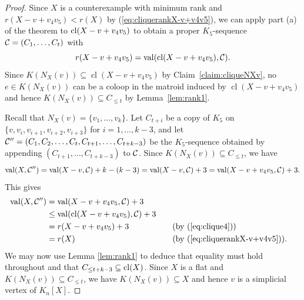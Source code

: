 \documentclass{daj}
\DeclareMathOperator{\cl}{cl}
\begin{document}
\begin{proof}

Since $X$ is a counterexample with minimum rank and $r(X-v+v_4v_5)<r(X)$ by (\ref{eq:cliquerankX-v+v4v5}), we can apply  part (a) of the theorem  
to ${\rm cl}(X-v+v_4v_5)$
to obtain a proper $K_5$-sequence ${\cal C}=(C_1,\dots, C_t)$ with 
\begin{equation}
\label{eq:clique4}
r(X-v+v_4v_5)={\rm val}(\cl(X-v+v_4v_5), {\cal C}).
\end{equation}
Since $K(N_X(v))\subseteq \cl(X-v+v_4v_5)$ by Claim~\ref{claim:cliqueNXv}, no $e\in K(N_X(v))$ can be a coloop in the matroid induced by  $\cl(X-v+v_4v_5)$ and hence 
%
$K(N_X(v))\subseteq  C_{\leq t}$ by Lemma~\ref{lem:rank1}.

Recall that $N_X(v)=\{v_1,\dots, v_k\}$.  Let $C_{t+i}$ be a copy  of $K_5$ on $\{v, v_i, v_{i+1}, v_{i+2}, v_{i+3}\}$ for $i=1, \dots, k-3$, and let ${\cal C}''=(C_1,C_2,\ldots,C_t,C_{t+1},\ldots, C_{t+k-3})$ be the  $K_5$-sequence obtained by
appending $(C_{t+1},\ldots,C_{t+k-3})$ to $\cal C$.
Since $K(N_X(v))\subseteq  C_{\leq t}$, we have $${\rm val}(X,{\cal C}'')={\rm val}(X-v,{\cal C})+k-(k-3)={\rm val}(X-v,{\cal C})+3={\rm val}(X-v+v_4v_5,{\cal C})+3.$$ This gives
\begin{alignat*}{2}
{\rm val}(X,{\cal C}'')&={\rm val}(X-v+v_4v_5,{\cal C})+3  \\
&\leq {\rm val}(\cl(X-v+v_4v_5),{\cal C})+3  \\
&=r(X-v+v_4v_5)+3 & \quad & (\text{by (\ref{eq:clique4})}) \\ 
&=r(X) & & (\text{by (\ref{eq:cliquerankX-v+v4v5})}).
\end{alignat*}
We may now use Lemma \ref{lem:rank1} to deduce that equality must hold throughout and that $C_{\leq t+k-3}\subseteq {\rm cl}(X)$. Since $X$ is a flat and $K(N_X(v))\subseteq  C_{\leq t}$, we have $K(N_X(v))\subseteq %
X$ and hence $v$ is a simplicial vertex of $K_n[X]$.


\end{proof}
\end{document}
